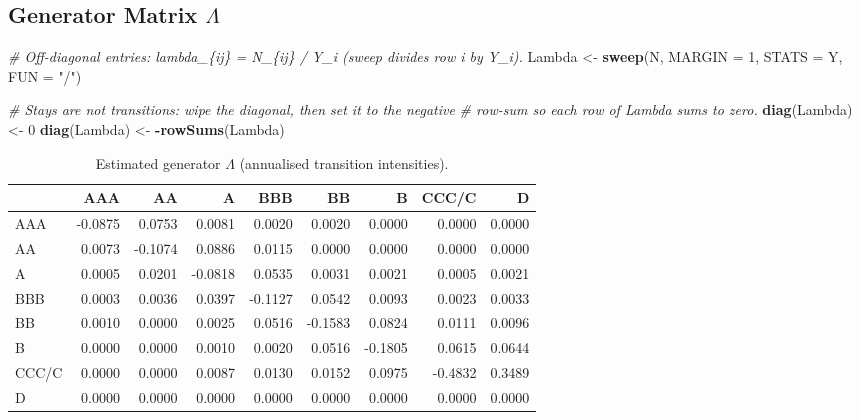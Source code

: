 \documentclass[
  11pt,
]{article}
\newenvironment{Shaded}{\begin{snugshade}}{\end{snugshade}}
\newcommand{\AttributeTok}[1]{\textcolor[rgb]{0.13,0.29,0.53}{#1}}
\newcommand{\CommentTok}[1]{\textcolor[rgb]{0.56,0.35,0.01}{\textit{#1}}}
\newcommand{\DecValTok}[1]{\textcolor[rgb]{0.00,0.00,0.81}{#1}}
\newcommand{\FunctionTok}[1]{\textcolor[rgb]{0.13,0.29,0.53}{\textbf{#1}}}
\newcommand{\NormalTok}[1]{#1}
\newcommand{\OtherTok}[1]{\textcolor[rgb]{0.56,0.35,0.01}{#1}}
\newcommand{\SpecialCharTok}[1]{\textcolor[rgb]{0.81,0.36,0.00}{\textbf{#1}}}
\newcommand{\StringTok}[1]{\textcolor[rgb]{0.31,0.60,0.02}{#1}}
\begin{document}
\subsection{\texorpdfstring{Generator Matrix
\(\Lambda\)}{Generator Matrix \textbackslash Lambda}}\label{generator-matrix-lambda}

\begin{Shaded}
\begin{Highlighting}[]
\CommentTok{\# Off{-}diagonal entries: lambda\_\{ij\} = N\_\{ij\} / Y\_i (sweep divides row i by Y\_i).}
\NormalTok{Lambda }\OtherTok{\textless{}{-}} \FunctionTok{sweep}\NormalTok{(N, }\AttributeTok{MARGIN =} \DecValTok{1}\NormalTok{, }\AttributeTok{STATS =}\NormalTok{ Y, }\AttributeTok{FUN =} \StringTok{"/"}\NormalTok{)}

\CommentTok{\# Stays are not transitions: wipe the diagonal, then set it to the negative}
\CommentTok{\# row{-}sum so each row of Lambda sums to zero.}
\FunctionTok{diag}\NormalTok{(Lambda) }\OtherTok{\textless{}{-}} \DecValTok{0}
\FunctionTok{diag}\NormalTok{(Lambda) }\OtherTok{\textless{}{-}} \SpecialCharTok{{-}}\FunctionTok{rowSums}\NormalTok{(Lambda)}
\end{Highlighting}
\end{Shaded}

\begin{longtable}[t]{lrrrrrrrr}
\caption{\label{tab:task1-Lambda-table}Estimated generator $\Lambda$ (annualised transition intensities).}\\
\toprule
 & AAA & AA & A & BBB & BB & B & CCC/C & D\\
\midrule
AAA & -0.0875 & 0.0753 & 0.0081 & 0.0020 & 0.0020 & 0.0000 & 0.0000 & 0.0000\\
AA & 0.0073 & -0.1074 & 0.0886 & 0.0115 & 0.0000 & 0.0000 & 0.0000 & 0.0000\\
A & 0.0005 & 0.0201 & -0.0818 & 0.0535 & 0.0031 & 0.0021 & 0.0005 & 0.0021\\
BBB & 0.0003 & 0.0036 & 0.0397 & -0.1127 & 0.0542 & 0.0093 & 0.0023 & 0.0033\\
BB & 0.0010 & 0.0000 & 0.0025 & 0.0516 & -0.1583 & 0.0824 & 0.0111 & 0.0096\\
\addlinespace
B & 0.0000 & 0.0000 & 0.0010 & 0.0020 & 0.0516 & -0.1805 & 0.0615 & 0.0644\\
CCC/C & 0.0000 & 0.0000 & 0.0087 & 0.0130 & 0.0152 & 0.0975 & -0.4832 & 0.3489\\
D & 0.0000 & 0.0000 & 0.0000 & 0.0000 & 0.0000 & 0.0000 & 0.0000 & 0.0000\\
\bottomrule
\end{longtable}
\end{document}
